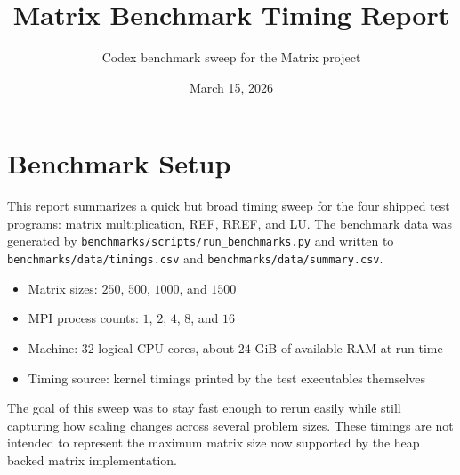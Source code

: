 \documentclass[11pt]{article}
\title{Matrix Benchmark Timing Report}
\author{Codex benchmark sweep for the Matrix project}
\date{March 15, 2026}
\begin{document}
\maketitle

\section{Benchmark Setup}
This report summarizes a quick but broad timing sweep for the four shipped test
programs: matrix multiplication, REF, RREF, and LU. The benchmark data was
generated by \texttt{benchmarks/scripts/run\_benchmarks.py} and written to
\texttt{benchmarks/data/timings.csv} and \texttt{benchmarks/data/summary.csv}.

\begin{itemize}
\item Matrix sizes: $250$, $500$, $1000$, and $1500$
\item MPI process counts: $1$, $2$, $4$, $8$, and $16$
\item Machine: $32$ logical CPU cores, about $24$ GiB of available RAM at run time
\item Timing source: kernel timings printed by the test executables themselves
\end{itemize}

The goal of this sweep was to stay fast enough to rerun easily while still
capturing how scaling changes across several problem sizes. These timings are
not intended to represent the maximum matrix size now supported by the heap
backed matrix implementation.
\end{document}
